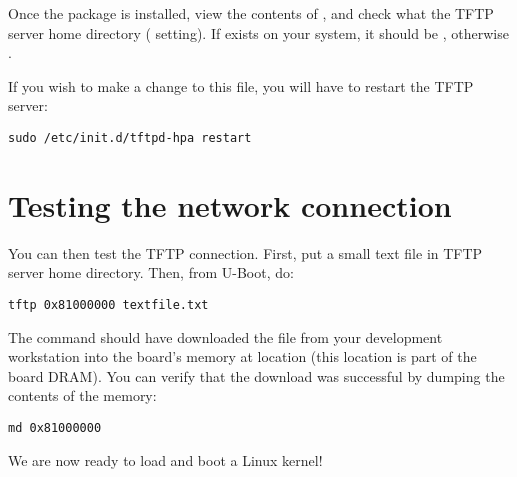 Once the package is installed, view the contents of
, and check what the TFTP server home directory
( setting). If  exists on your system,
it should be , otherwise .

If you wish to make a change to this file, you will have to restart the TFTP server:

\begin{verbatim}
sudo /etc/init.d/tftpd-hpa restart
\end{verbatim}

\section{Testing the network connection}

You can then test the TFTP connection.  First, put a small text
file in TFTP server home directory. Then, from U-Boot, do:

\begin{verbatim}
tftp 0x81000000 textfile.txt
\end{verbatim}

The  command should have downloaded the
 file from your development workstation into the
board's memory at location  (this location is part of
the board DRAM). You can verify that the download was successful by
dumping the contents of the memory:

\begin{verbatim}
md 0x81000000
\end{verbatim}

We are now ready to load and boot a Linux kernel!
